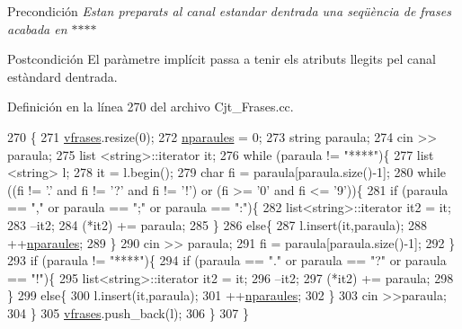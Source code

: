 \begin{DoxyPrecond}{Precondición}
{\itshape Estan preparats al canal estandar d\textquotesingle{}entrada una seqüència de frases acabada en $\ast$$\ast$$\ast$$\ast$} 
\end{DoxyPrecond}
\begin{DoxyPostcond}{Postcondición}
El paràmetre implícit passa a tenir els atributs llegits pel canal estàndard d\textquotesingle{}entrada. 
\end{DoxyPostcond}


Definición en la línea 270 del archivo Cjt\+\_\+\+Frases.\+cc.


\begin{DoxyCode}
270                         \{  
271   \hyperlink{class_cjt___frases_a5323db427d06a961818c318d9ba79f3d}{vfrases}.resize(0);
272   \hyperlink{class_cjt___frases_a026637b08f81acc25c6084146d73fc40}{nparaules} = 0;  
273     \textcolor{keywordtype}{string} paraula;
274     cin >> paraula;
275   list <string>::iterator it;
276     \textcolor{keywordflow}{while} (paraula != \textcolor{stringliteral}{"****"})\{
277     list <string> l;
278         it = l.begin();
279         \textcolor{keywordtype}{char} fi = paraula[paraula.size()-1];
280         \textcolor{keywordflow}{while} ((fi != \textcolor{charliteral}{'.'} and fi != \textcolor{charliteral}{'?'} and fi != \textcolor{charliteral}{'!'}) or (fi >= \textcolor{charliteral}{'0'} and fi <= \textcolor{charliteral}{'9'}))\{
281       \textcolor{keywordflow}{if} (paraula == \textcolor{stringliteral}{","} or paraula == \textcolor{stringliteral}{";"} or paraula == \textcolor{stringliteral}{":"})\{
282         list<string>::iterator it2 = it;
283         --it2;
284         (*it2) += paraula;
285       \}
286       \textcolor{keywordflow}{else}\{  
287         l.insert(it,paraula);
288         ++\hyperlink{class_cjt___frases_a026637b08f81acc25c6084146d73fc40}{nparaules};
289       \}
290       cin >> paraula;
291       fi = paraula[paraula.size()-1];
292     \}
293     \textcolor{keywordflow}{if} (paraula != \textcolor{stringliteral}{"****"})\{
294       \textcolor{keywordflow}{if} (paraula == \textcolor{stringliteral}{"."} or paraula == \textcolor{stringliteral}{"?"} or paraula == \textcolor{stringliteral}{"!"})\{
295         list<string>::iterator it2 = it;
296         --it2;
297         (*it2) += paraula;
298       \}
299       \textcolor{keywordflow}{else}\{
300         l.insert(it,paraula);
301         ++\hyperlink{class_cjt___frases_a026637b08f81acc25c6084146d73fc40}{nparaules};
302       \}
303       cin >>paraula;
304     \}
305     \hyperlink{class_cjt___frases_a5323db427d06a961818c318d9ba79f3d}{vfrases}.push\_back(l); 
306     \}
307 \}
\end{DoxyCode}
